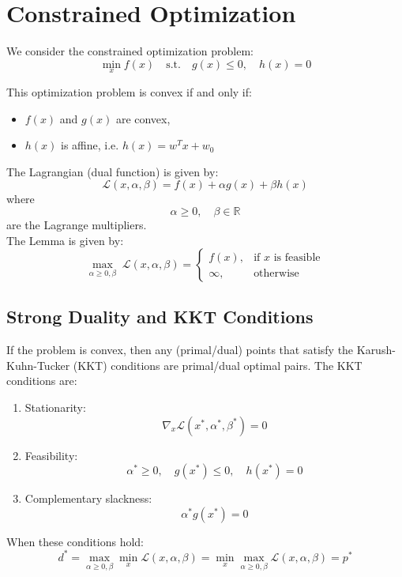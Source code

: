 \documentclass[11pt]{article}
\begin{document}
\section*{Constrained Optimization}

We consider the constrained optimization problem:
\[
	\min_{x} f(x) \quad \text{s.t.} \quad g(x) \leq 0, \quad h(x) = 0
\]

This optimization problem is convex if and only if:
\begin{itemize}
	\item $f(x)$ and $g(x)$ are convex,
	\item $h(x)$ is affine, i.e. \(h(x) = w^T x + w_0\)
\end{itemize}
The Lagrangian (dual function) is given by:
\[
	\mathcal{L}(x, \alpha, \beta) = f(x) + \alpha g(x) + \beta h(x)
\]
where
\[
	\alpha \geq 0, \quad \beta \in \mathbb{R}
\]
are the Lagrange multipliers.\\
The Lemma is given by:
\[
	\max_{\alpha \geq 0, \beta} \; \mathcal{L}(x, \alpha, \beta) =
	\begin{cases}
		f(x),   & \text{if $x$ is feasible} \\
		\infty, & \text{otherwise}
	\end{cases}
\]



\subsection*{Strong Duality and KKT Conditions}

If the problem is convex, then any (primal/dual) points that satisfy the
Karush-Kuhn-Tucker (KKT) conditions are primal/dual optimal pairs. The KKT conditions are:

\begin{enumerate}
	\item Stationarity:
	      \[
		      \nabla_x \mathcal{L}(x^*, \alpha^*, \beta^*) = 0
	      \]
	\item Feasibility:
	      \[
		      \alpha^* \geq 0, \quad g(x^*) \leq 0, \quad h(x^*) = 0
	      \]
	\item Complementary slackness:
	      \[
		      \alpha^* g(x^*) = 0
	      \]
\end{enumerate}

When these conditions hold:
\[
	d^* = \max_{\alpha \geq 0, \beta} \min_x \mathcal{L}(x, \alpha, \beta)
	= \min_x \max_{\alpha \geq 0, \beta} \mathcal{L}(x, \alpha, \beta) = p^*
\]
\end{document}
